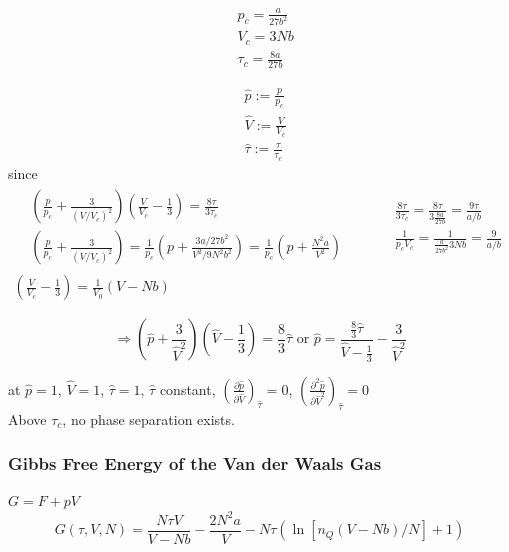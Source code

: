 \[
\begin{aligned}
  & p_c = \frac{a}{27 b^2} \\ 
  & V_c = 3Nb \\ 
  & \tau_c = \frac{8a}{ 27b}
\end{aligned}
\]

\[
\begin{aligned}
  & \widehat{p} := \frac{p}{p_c} \\ 
  & \widehat{V} := \frac{V}{V_c} \\ 
  & \widehat{\tau} := \frac{ \tau}{ \tau_c}
\end{aligned}
\]
since
\[
\begin{gathered}
\begin{aligned}
  & \left( \frac{p}{p_c} + \frac{3}{ (V/V_c)^2 } \right)\left( \frac{V}{V_c} - \frac{1}{3} \right) = \frac{8 \tau }{ 3\tau_c} \\
  & \left( \frac{p}{p_c} + \frac{3}{ (V/V_c)^2} \right) = \frac{1}{p_c} ( p + \frac{3a/27b^2}{ V^2/9N^2 b^2 } ) = \frac{1}{p_c} ( p + \frac{N^2 a}{V^2} ) 
\end{aligned} \quad \quad \, 
\begin{aligned}
  & \frac{8\tau}{3\tau_c} = \frac{8 \tau}{ 3 \frac{ 8a}{27b} } = \frac{9\tau}{a/b} \\ 
  & \frac{1}{p_c V_c} = \frac{1}{ \frac{a}{27 b^2} 3Nb } = \frac{9}{a/b}
\end{aligned} \\
\left( \frac{V}{V_c} - \frac{1}{3} \right) = \frac{1}{V_0}(V-Nb)
\end{gathered}
\]

\[
\Longrightarrow \left( \widehat{p} + \frac{3}{ \widehat{V}^2 } \right)\left( \widehat{V} - \frac{1}{3} \right) = \frac{8}{3} \widehat{\tau} \text{ or } \widehat{p} = \frac{ \frac{8}{3} \widehat{\tau} }{ \widehat{V} - \frac{1}{3} } - \frac{3}{ \widehat{V}^2}
\]

at $\widehat{p} =1$, $\widehat{V}=1$, $\widehat{\tau}=1$, $\widehat{\tau}$ constant, $\left( \frac{ \partial \widehat{p}}{ \partial \widehat{V}} \right)_{\widehat{\tau}} =0$, $\left( \frac{ \partial^2 \widehat{p}}{ \partial \widehat{V}^2} \right)_{\widehat{\tau}} =0$ \\
Above $\tau_c$, no phase separation exists.  

\subsubsection*{Gibbs Free Energy of the Van der Waals Gas} $G= F+pV$
\[
G(\tau,V,N) = \frac{ N \tau V}{ V - Nb} - \frac{2N^2 a}{V} - N\tau ( \ln{ [n_Q(V-Nb)/N] } + 1)
\]

